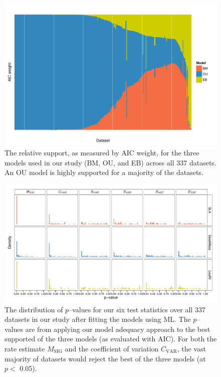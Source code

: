 \documentclass[a4paper,11pt]{article}
\begin{document}
{\begin{figure}[p]
  \centering
  \includegraphics[angle=90, origin=c, scale=0.8]{figs/aic-support}
  \caption{The relative support, as measured by AIC weight, for the three models used in our study (BM, OU, and EB) across all 337 datasets. An OU model is highly supported for a majority of the datasets.}
  \label{fig:aic-support}
\end{figure}

\begin{figure}[p]
  \centering
  \includegraphics[angle=90, origin=c, scale=0.85]{figs/pval-hist-ml}
  \caption{The distribution of $p$--values for our six test statistics over all 337 datasets in our study after fitting the models using ML. The $p$--values are from applying our model adequacy approach to the best supported of the three models (as evaluated with AIC). For both the rate estimate $M_{\text{SIG}}$ and the coefficient of variation $C_{\text{VAR}}$, the vast majority of datasets would reject the best of the three models (at $p<$ 0.05).}
  \label{fig:pvalues}
\end{figure}

}
\end{document}

